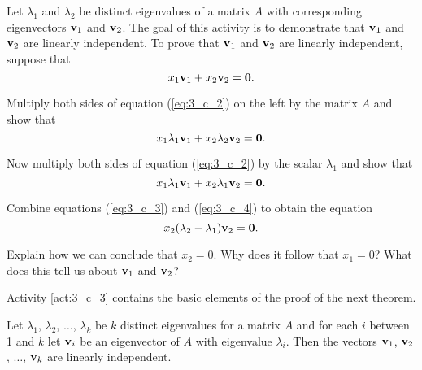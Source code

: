 \begin{activity} \label{act:3_c_3} Let $\lambda_1$ and $\lambda_2$ be distinct eigenvalues of a matrix $A$ with corresponding eigenvectors $\mathbf{v}_1$ and $\mathbf{v}_2$. The goal of this activity is to demonstrate that $\mathbf{v}_1$ and $\mathbf{v}_2$ are linearly independent. To prove that $\mathbf{v}_1$ and $\mathbf{v}_2$ are linearly independent, suppose that 
\begin{equation} \label{eq:3_c_2}
x_1\mathbf{v}_1 + x_2 \mathbf{v}_2 = \mathbf{0}.
\end{equation}
\ba
\item Multiply both sides of equation (\ref{eq:3_c_2}) on the left by the matrix $A$ and show that 
\begin{equation} \label{eq:3_c_3}
x_1\lambda_1\mathbf{v}_1 + x_2 \lambda_2\mathbf{v}_2 = \mathbf{0}.
\end{equation}



\item Now multiply both sides of equation (\ref{eq:3_c_2}) by the scalar $\lambda_1$ and show that 
\begin{equation} \label{eq:3_c_4}
x_1\lambda_1\mathbf{v}_1 + x_2 \lambda_1\mathbf{v}_2 = \mathbf{0}.
\end{equation}



\item Combine equations (\ref{eq:3_c_3}) and (\ref{eq:3_c_4}) to obtain the equation
\begin{equation} \label{eq:3_c_5}
x_2(\lambda_2-\lambda_1)\mathbf{v}_2 = \mathbf{0}.
\end{equation}



\item Explain how we can conclude that $x_2 = 0$. Why does it follow that $x_1 = 0$? What does this tell us about $\mathbf{v}_1$ and $\mathbf{v}_2$? 



\ea

\end{activity}



Activity \ref{act:3_c_3} contains the basic elements of the proof of the next theorem.



\begin{theorem} \label{thm:4_b_lin_indep_evects}  Let $\lambda_1$, $\lambda_2$, $\ldots$, $\lambda_k$ be $k$ distinct eigenvalues for a matrix $A$ and for each $i$ between 1 and $k$ let $\mathbf{v}_i$ be an eigenvector of $A$ with eigenvalue $\lambda_i$. Then the vectors $\mathbf{v}_1$, $\mathbf{v}_2$, $\ldots$, $\mathbf{v}_k$ are linearly independent.
\end{theorem}


